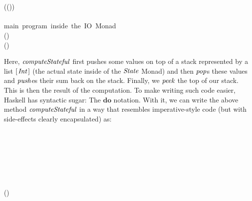 \documentclass[paper=A4,twoside=true,openright,parskip=full,chapterprefix=true,headings=normal,bibliography=totoc,listof=totoc,titlepage=on,captions=tableabove,draft=false,british]{scrreprt}%
\begin{document}
\begin{hscode}
\>[B]{}\<[19]%
\>[19]{}\;\sequ {}\<[E]%
\\
\>[B]{}\<[19]%
\>[19]{}\bind \lambda {}\to {}\<[E]%
\\
\>[19]{}\<[21]%
\>[21]{}(\bind \lambda {}\to {}\;(\mathbin{+}))\sequ {}\<[E]%
\\
\>[B]{}\<[19]%
\>[19]{}\<[E]%
\\[\blanklineskip]%
\>[B]{}\mbox{\onelinecomment  main program inside the IO Monad          }{}\<[E]%
\\
\>[B]{}\mathbin{::}\;(){}\<[E]%
\\
\>[B]{}\mathrel{=}\;(\;\;){}\<[E]%
\ColumnHook
\end{hscode}\resethooks
\vspace{-2\baselineskip}

Here, \ensuremath{\Varid{computeStateful}} first pushes some values on top of a stack
represented by a list \ensuremath{[\mskip1.5mu \Conid{Int}\mskip1.5mu]} (the actual state inside of the \ensuremath{\Conid{State}}
Monad) and then \ensuremath{\Varid{pop}}s these values and \ensuremath{\Varid{push}}es their sum back on the
stack. Finally, we \ensuremath{\Varid{peek}} the top of our stack. This is then the result
of the computation. To make writing such code easier, Haskell has
syntactic sugar: The \ensuremath{\mathbf{do}} notation. With it, we can write the above
method \ensuremath{\Varid{computeStateful}} in a way that resembles imperative-style code
(but with side-effects clearly encapsulated) as:


\begin{hscode}\SaveRestoreHook
{}%
%
%
\>[B]{}\mathbin{::}\;\;\<[E]%
\\
\>[B]{}\mathrel{=}\<[E]%
\\
\>[B]{}\<[5]%
\>[5]{}\;\<[E]%
\\
\>[B]{}\<[5]%
\>[5]{}\;\<[E]%
\\
\>[B]{}\<[5]%
\>[5]{}\leftarrow {}\<[E]%
\\
\>[B]{}\<[5]%
\>[5]{}\leftarrow {}\<[E]%
\\
\>[B]{}\<[5]%
\>[5]{}\;(\mathbin{+}){}\<[E]%
\\
\>[B]{}\<[5]%
\>[5]{}\<[E]%
\ColumnHook
\end{hscode}\resethooks
\vspace{-2\baselineskip}
\end{document}
